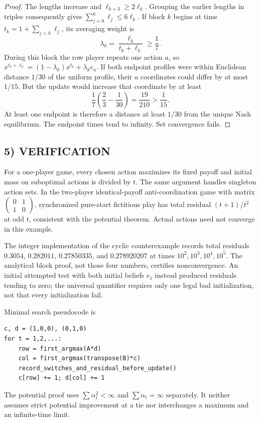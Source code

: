 \documentclass[11pt,a4paper]{article}
\theoremstyle{definition}
\theoremstyle{remark}
\begin{document}
\begin{proof}
The lengths increase and $\ell_{k+3}\geq2\ell_k$. Grouping the earlier lengths
in triples consequently gives $\sum_{j=0}^k\ell_j\leq6\ell_k$.
If block $k$ begins at time $t_k=1+\sum_{j<k}\ell_j$, its averaging weight is
\[
 \lambda_k=\frac{\ell_k}{t_k+\ell_k}\geq\frac17.
\]
During this block the row player repeats one action $a$, so
$x^{t_k+\ell_k}=(1-\lambda_k)x^{t_k}+\lambda_ke_a$.
If both endpoint profiles were within Euclidean distance $1/30$ of the uniform
profile, their $a$ coordinates could differ by at most $1/15$. But the update
would increase that coordinate by at least
\[
 \frac17\left(\frac23-\frac1{30}\right)=\frac{19}{210}>\frac1{15}.
\]
At least one endpoint is therefore a distance at least $1/30$ from the unique
Nash equilibrium. The endpoint times tend to infinity. Set convergence fails.
\end{proof}

\subsection*{5) VERIFICATION}
For a one-player game, every chosen action maximizes its fixed payoff and initial
mass on suboptimal actions is divided by $t$. The same argument handles singleton
action sets. In the two-player identical-payoff anti-coordination game with matrix
$\left(\begin{smallmatrix}0&1\\1&0\end{smallmatrix}\right)$, synchronized pure-start
fictitious play has total residual $(t+1)/t^2$ at odd $t$, consistent with the
potential theorem. Actual actions need not converge in this example.

The integer implementation of the cyclic counterexample records total residuals
$0.3054$, $0.282011$, $0.27850335$, and $0.278920207$ at times
$10^2,10^3,10^4,10^5$. The analytical block proof, not those four numbers,
certifies nonconvergence. An initial attempted test with both initial beliefs
$e_1$ instead produced residuals tending to zero; the universal quantifier requires
only one legal bad initialization, not that every initialization fail.

Minimal search pseudocode is
\begin{lstlisting}
c, d = (1,0,0), (0,1,0)
for t = 1,2,...:
    row = first_argmax(A*d)
    col = first_argmax(transpose(B)*c)
    record_switches_and_residual_before_update()
    c[row] += 1; d[col] += 1
\end{lstlisting}
The potential proof uses $\sum\alpha_t^2<\infty$ and
$\sum\alpha_t=\infty$ separately. It neither assumes strict potential improvement
at a tie nor interchanges a maximum and an infinite-time limit.
\end{document}

